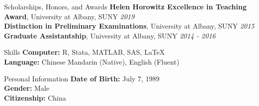 \documentclass{resume_liang} %
\begin{document}
\begin{rSection}{Scholarships, Honors, and Awards} 
{\bf Helen Horowitz Excellence in Teaching Award}{, University at Albany, SUNY} \hfill{\em 2019}  \\ 
{\bf Distinction in Preliminary Examinations}{, University at Albany, SUNY} \hfill{\em 2015}  \\
{\bf Graduate Assistantship}{, University at Albany, SUNY} \hfill{\em 2014 - 2016}  \\
\end{rSection}
\bigskip \bigskip





\begin{rSection}{Skills}
{\bf Computer:} R, Stata, MATLAB, SAS, LaTeX
\\
{\bf Language:} Chinese Mandarin (Native), English (Fluent) 
\end{rSection}
\bigskip \bigskip









\begin{rSection}{Personal Information }
{\bf Date of Birth:} July 7, 1989  \\
{\bf Gender:} Male  \\
{\bf Citizenship:} China
\\
\end{rSection}
\end{document}
